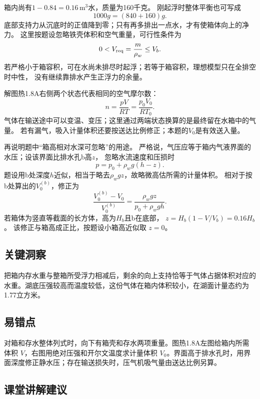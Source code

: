 \documentclass[UTF8,fontset=fandol,a4paper,11pt]{ctexart}
\begin{document}
箱内尚有$1-0.84=0.16\,\mathrm{m^3}$水，质量为160千克。
刚起浮时整体平衡也可写成
\[
1000g=(840+160)g.
\]
底部支持力从沉底时的正值降到零；只有再多排出一点水，才有使箱体向上的净力。
这里按题设忽略铁壳体积和空气重量，可行性条件为
\[
0<V_{\rm req}=\frac m{\rho_w}\le V_b.
\]
若严格小于箱容积，可在水尚未排尽时起浮；若等于箱容积，理想模型只在全排空时中性，
没有继续靠排水产生正浮力的余量。

解图热1.8A右侧两个状态代表相同的空气摩尔数：
\[
n=\frac{pV}{RT}=\frac{p_0V_0}{RT_0}.
\]
气体在输送途中可以变温、变压；这里通过两端状态换算的是最终留在水箱中的气量。
若有漏气，吸入计量体积还要按送达比例修正；本题的$V_0$是有效送入量。

再说明题中“箱高相对水深可忽略”的用途。
严格说，气压应等于箱内气液界面的水压；设该界面比排水孔b高$z$，
忽略水流速度和压损时
\[
p=p_0+\rho_wg(h-z).
\]
题设用b处深度$h$近似，相当于略去$\rho_wgz$，故略微高估所需的计量体积。
相对于按b处算出的$V_0^{(b)}$，修正为
\[
\frac{V_0^{(b)}-V_0}{V_0^{(b)}}
=\frac{\rho_wgz}{p_0+\rho_wgh}.
\]
若箱体为竖直等截面的长方体，高为$H_b$且b在底部，
$z=H_b(1-V/V_b)=0.16H_b$。
该修正与箱高成正比，按题设小箱高近似取 $z=0$。




\subsection*{关键洞察}

把箱内存水重与整箱所受浮力相减后，剩余的向上支持恰等于气体占据体积对应的水重。湖底压强较高而温度较低，这份气体在箱内体积较小，在湖面计量态约为1.77立方米。



\subsection*{易错点}

对箱和存水整体列式时，向下有箱壳和存水两项重量。图热1.8A左图给箱内所需体积 $V$，右图用绝对压强和开尔文温度求计量体积 $V_0$。界面高于排水孔时，用界面深度修正静水压；存在输送损失时，压气机吸气量由送达比例另算。



\subsection*{课堂讲解建议}
\end{document}
